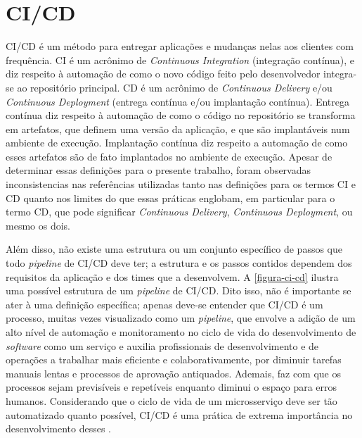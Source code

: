 \section{CI/CD}\label{secao-cicd}
CI/CD é um método para entregar aplicações e mudanças nelas aos clientes com frequência. CI é um acrônimo de \emph{Continuous Integration} (integração contínua), e diz respeito à automação de como o novo código feito pelo desenvolvedor integra-se ao repositório principal. CD é um acrônimo de \emph{Continuous Delivery} e/ou \emph{Continuous Deployment} (entrega contínua e/ou implantação contínua). Entrega contínua diz respeito à automação de como o código no repositório se transforma em artefatos, que definem uma versão da aplicação, e que são implantáveis num ambiente de execução. Implantação contínua diz respeito a automação de como esses artefatos são de fato implantados no ambiente de execução. Apesar de determinar essas definições para o presente trabalho, foram observadas inconsistencias nas referências utilizadas tanto nas definições para os termos CI e CD quanto nos limites do que essas práticas englobam, em particular para o termo CD, que pode significar \emph{Continuous Delivery}, \emph{Continuous Deployment}, ou mesmo os dois. \cite{harness-ci-cd,redhat-ci-cd}

Além disso, não existe uma estrutura ou um conjunto específico de passos que todo \emph{pipeline} de CI/CD deve ter; a estrutura e os passos contidos dependem dos requisitos da aplicação e dos times que a desenvolvem. A \autoref{figura-ci-cd} ilustra uma possível estrutura de um \emph{pipeline} de CI/CD. Dito isso, não é importante se ater à uma definição específica; apenas deve-se entender que CI/CD é um processo, muitas vezes visualizado como um \emph{pipeline}, que envolve a adição de um alto nível de automação e monitoramento no ciclo de vida do desenvolvimento de \emph{software} como um serviço e auxilia profissionais de desenvolvimento e de operações a trabalhar mais eficiente e colaborativamente, por diminuir tarefas manuais lentas e processos de aprovação antiquados. Ademais, faz com que os processos sejam previsíveis e repetíveis enquanto diminui o espaço para erros humanos. Considerando que o ciclo de vida de um microsserviço deve ser tão automatizado quanto possível, CI/CD é uma prática de extrema importância no desenvolvimento desses \cite{redhat-ci-cd, gitlab-ci-cd}.

